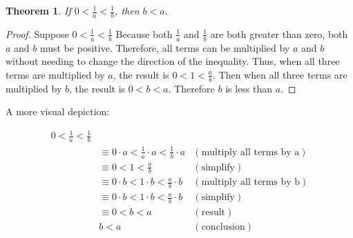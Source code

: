 
\newtheorem{theorem}{Theorem}

\begin{theorem}
  If $0 < \frac{1}{a} < \frac{1}{b}$, then $b < a.$
\end{theorem}

\begin{proof}
  Suppose $0 < \frac{1}{a} < \frac{1}{b}$ Because both $\frac{1}{a}$ and
  $\frac{1}{b}$ are both greater than zero, both $a$ and $b$ must be positive.
  Therefore, all terms can be multiplied by $a$ and $b$ without needing to
  change the direction of the inequality. Thus, when all three terms are
  multiplied by $a$, the result is $0 < 1 < \frac{a}{b}$. Then when all three
  terms are multiplied by $b$, the result is $0 < b < a$. Therefore $b$ is less
  than $a$.
\end{proof}

A more visual depiction:


\begin{align*}
  0 < \frac{1}{a} < \frac{1}{b}\\  
  &\equiv 0 \cdot a < \frac{1}{a} \cdot a < \frac{1}{b} \cdot a
    &(\textrm{multiply all terms by a})\\
  &\equiv 0 < 1 < \frac{a}{b} &(\textrm{simplify})\\
  &\equiv 0 \cdot b < 1 \cdot b < \frac{a}{b} \cdot b &(\textrm{multiply all
    terms by b})\\
  &\equiv 0 \cdot b < 1 \cdot b < \frac{a}{b} \cdot b &(\textrm{simplify})\\
  & \equiv 0 < b < a &(\textrm{result})\\
  & b < a &(\textrm{conclusion})
\end{align*}
